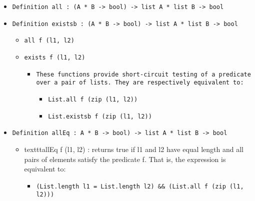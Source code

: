 \documentclass[11pt]{report}
\begin{document}
\begin{itemize}
\begin{itemize}
\begin{itemize}
\end{itemize}

\end{itemize}

\item  \texttt{Definition all : (A * B -> bool) -> list A * list B -> bool}

\item  \texttt{Definition existsb : (A * B -> bool) -> list A * list B -> bool}

\begin{itemize}
\item \texttt{all f (l1, l2)}
\item \texttt{exists f (l1, l2)}

\begin{itemize}
\item \begin{flushleft} \texttt{These functions provide short-circuit testing of a predicate over a pair of lists. They are respectively equivalent to:} \end{flushleft}

\begin{itemize}
\item  \texttt{List.all f (zip (l1, l2))}
\item  \texttt{List.existsb f (zip (l1, l2))}
\end{itemize}

\end{itemize}

\end{itemize}

\item  \texttt{Definition allEq : A * B -> bool) -> list A * list B -> bool}

\begin{itemize}
\item  \begin{flushleft} texttt{allEq f (l1, l2) : returns true if l1 and l2 have equal length and all pairs of elements satisfy the predicate f. That is, the expression is equivalent to:} \end{flushleft}

\begin{itemize}
\item  \texttt{(List.length l1 = List.length l2) \&\& (List.all f (zip (l1, l2)))}

\end{itemize}

\end{itemize}

\end{itemize}
\end{document}
